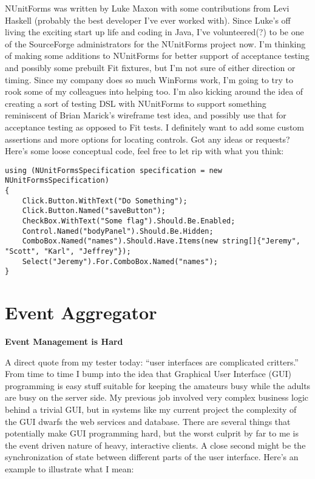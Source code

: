 \documentclass{article}
\begin{document}
{NUnitForms was written by Luke Maxon with some contributions from Levi Haskell (probably the best developer I've ever worked with).  Since Luke's off living the exciting start up life and coding in Java, I've volunteered(?) to be one of the SourceForge administrators for the NUnitForms project now.  I'm thinking of making some additions to NUnitForms for better support of acceptance testing and possibly some prebuilt Fit fixtures, but I'm not sure of either direction or timing.  Since my company does so much WinForms work, I'm going to try to rook some of my colleagues into helping too.  I'm also kicking around the idea of creating a sort of testing DSL with NUnitForms to support something reminiscent of Brian Marick's wireframe test idea, and possibly use that for acceptance testing as opposed to Fit tests.  I definitely want to add some custom assertions and more options for locating controls.  Got any ideas or requests?  Here's some loose conceptual code, feel free to let rip with what you think:

 
\begin{lstlisting}
using (NUnitFormsSpecification specification = new NUnitFormsSpecification)
{
	Click.Button.WithText("Do Something");
	Click.Button.Named("saveButton");
	CheckBox.WithText("Some flag").Should.Be.Enabled;
	Control.Named("bodyPanel").Should.Be.Hidden;
	ComboBox.Named("names").Should.Have.Items(new string[]{"Jeremy", "Scott", "Karl", "Jeffrey"});
	Select("Jeremy").For.ComboBox.Named("names");
}
\end{lstlisting}




\section{ Event Aggregator } 

\Large {\textbf{Event Management is Hard}}

A direct quote from my tester today:  “user interfaces are complicated critters.”  From time to time I bump into the idea that Graphical User Interface (GUI) programming is easy stuff suitable for keeping the amateurs busy while the adults are busy on the server side.  My previous job involved very complex business logic behind a trivial GUI, but in systems like my current project the complexity of the GUI dwarfs the web services and database.  There are several things that potentially make GUI programming hard, but the worst culprit by far to me is the event driven nature of heavy, interactive clients.  A close second might be the synchronization of state between different parts of the user interface.  Here's an example to illustrate what I mean:

}
\end{document}
